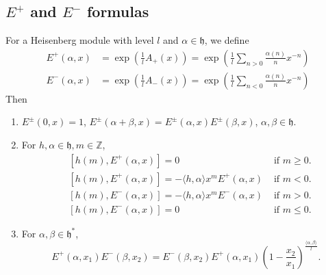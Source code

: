 \documentclass[11pt,oneside,reqno]{amsart}
\theoremstyle{definition}
\newcommand{\Z}{{\mathbb Z}}
\newcommand{\h}{{\mathfrak h}}
\begin{document}
\subsection{$E^+$ and $E^-$ formulas} %
For a Heisenberg module with level $l$ and $\alpha\in \h$, we define 
\begin{align*}
    E^+(\alpha, x)&=\exp\left(\frac 1 l A_+(x)\right) =\exp\left(\frac 1 l \sum_{n>0} \frac{\alpha(n)}{n}x^{-n}\right)\\
    E^-(\alpha, x)&=\exp\left(\frac 1 l A_-(x)\right) =\exp\left(\frac 1 l \sum_{n<0} \frac{\alpha(n)}{n}x^{-n}\right)
\end{align*}
Then 
\begin{enumerate}
    \item $E^\pm(0, x) = 1$, $E^\pm(\alpha+\beta, x) = E^\pm(\alpha, x)E^\pm (\beta, x)$, $\alpha, \beta \in \h$. 
    \item For $h, \alpha \in \h, m \in \Z$, 
    \begin{align*}
        & [h(m), E^+(\alpha, x)]= 0 & \text{ if }m\geq 0. \\
        & [h(m), E^+(\alpha, x)]= -\langle h, \alpha\rangle x^m E^+(\alpha, x) &\text{ if } m<0. \\
        & [h(m), E^-(\alpha, x)]= -\langle h, \alpha\rangle x^m E^-(\alpha, x) &\text{ if } m> 0. \\        
        & [h(m), E^-(\alpha, x)]= 0 & \text{ if }m\leq 0. 
    \end{align*}
    \item For $\alpha, \beta\in \h^*$, 
    $$E^+(\alpha, x_1)E^-(\beta, x_2) = E^-(\beta, x_2)E^+(\alpha, x_1) \left(1-\frac {x_2}{x_1}\right)^{\frac{\langle \alpha, \beta\rangle}{l}}. $$
\end{enumerate}
\end{document}
